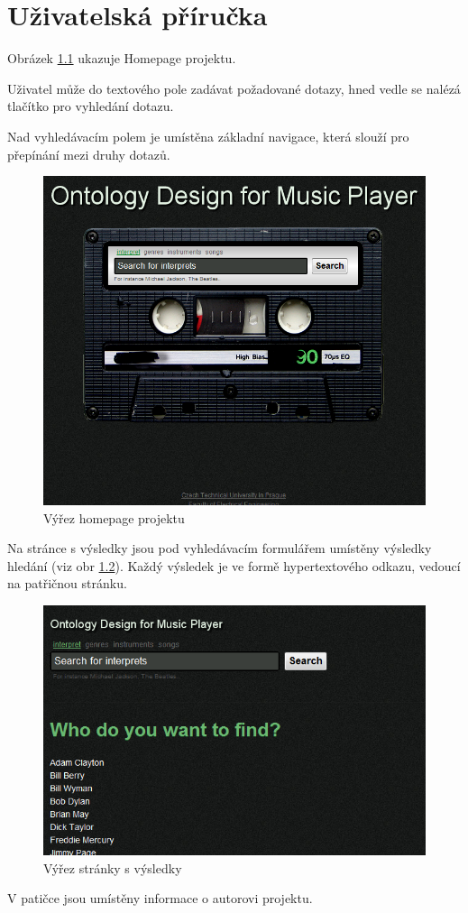 \chapter{Uživatelská příručka}

Obrázek \ref{img:hp} ukazuje Homepage projektu.

Uživatel může do textového pole zadávat požadované dotazy, hned vedle se nalézá tlačítko pro vyhledání dotazu.

Nad vyhledávacím polem je umístěna základní navigace, která slouží pro přepínání mezi druhy dotazů.

\begin{figure}[h]
\begin{center}
\includegraphics[width=15cm]{figures/hp}
\caption{Výřez homepage projektu}
\label{img:hp}
\end{center}
\end{figure}

Na stránce s výsledky jsou pod vyhledávacím formulářem umístěny výsledky hledání (viz obr \ref{img:searchresults}). Každý výsledek je ve formě hypertextového odkazu, vedoucí na patřičnou stránku.

\begin{figure}[h]
\begin{center}
\includegraphics[width=14cm]{figures/searchresults}
\caption{Výřez stránky s výsledky}
\label{img:searchresults}
\end{center}
\end{figure}

V patičce jsou umístěny informace o autorovi projektu.